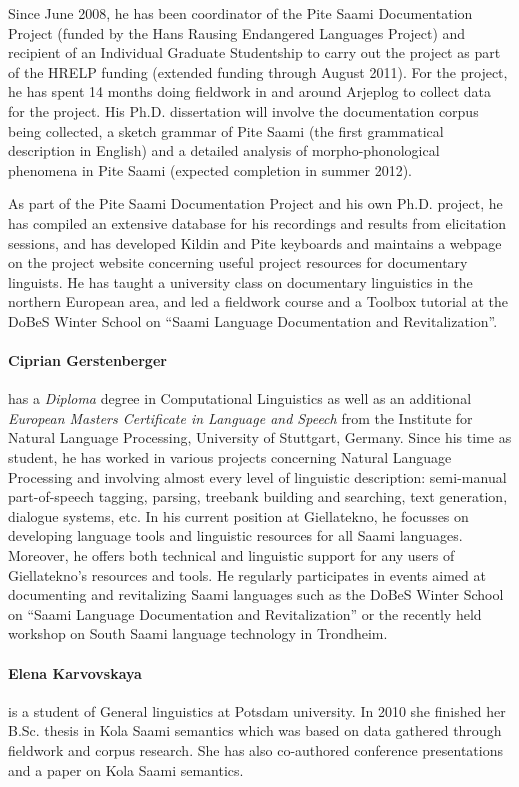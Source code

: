 \documentclass[a4paper,12pt]{article}
\begin{document}
{{Since June 2008, he has been coordinator of the Pite Saami Documentation Project (funded by the Hans Rausing Endangered Languages Project) and recipient of an Individual Graduate Studentship to carry out the project as part of the HRELP funding (extended funding through August 2011). For the project, he has spent 14 months doing fieldwork in and around Arjeplog to collect data for the project. His Ph.D. dissertation will involve the documentation corpus being collected, a sketch grammar of Pite Saami (the first grammatical description in English) and a detailed analysis of morpho-phonological phenomena in Pite Saami (expected completion in summer 2012).

As part of the Pite Saami Documentation Project and his own Ph.D. project, he has compiled an extensive database for his recordings and results from elicitation sessions, and has developed Kildin and Pite keyboards and maintains a webpage on the project website concerning useful project resources for documentary linguists. He has taught a university class on documentary linguistics in the northern European area, and led a fieldwork course and a Toolbox tutorial at the DoBeS Winter School on “Saami Language Documentation and Revitalization”.

\paragraph{Ciprian Gerstenberger} has a \textit{Diploma} degree in Computational Linguistics as well as an additional  \textit{European Masters Certificate in Language and Speech} from the Institute for Natural Language Processing, University of Stuttgart, Germany. Since his time as student, he has worked in various projects concerning Natural Language Processing and involving almost every level of linguistic description: semi-manual part-of-speech tagging, parsing, treebank building and searching, text generation, dialogue systems, etc.  In his current position at Giellatekno, he focusses on developing language tools and linguistic resources for all Saami languages.  Moreover, he offers both technical and linguistic support for any users of Giellatekno's resources and tools. He regularly participates in events aimed at documenting and revitalizing Saami languages such as the DoBeS Winter School on “Saami Language Documentation and Revitalization” or the recently held workshop on South Saami language technology in Trondheim.

\paragraph{Elena Karvovskaya} is a student of General linguistics at Potsdam university. In 2010 she finished her B.Sc. thesis in Kola Saami semantics which was based on data gathered through fieldwork and corpus research. She has also co-authored conference presentations and a paper on Kola Saami semantics.

}}
\end{document}
